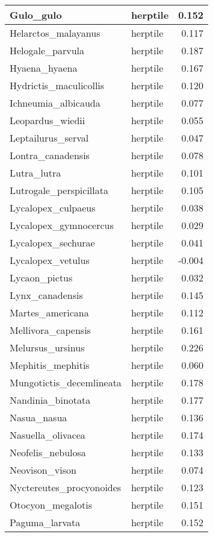 \begin{table}
\begin{tabular}[t]{l|l|r}
\hline
Gulo\_gulo & herptile & 0.152\\
\hline
Helarctos\_malayanus & herptile & 0.117\\
\hline
Helogale\_parvula & herptile & 0.187\\
\hline
Hyaena\_hyaena & herptile & 0.167\\
\hline
Hydrictis\_maculicollis & herptile & 0.120\\
\hline
Ichneumia\_albicauda & herptile & 0.077\\
\hline
Leopardus\_wiedii & herptile & 0.055\\
\hline
Leptailurus\_serval & herptile & 0.047\\
\hline
Lontra\_canadensis & herptile & 0.078\\
\hline
Lutra\_lutra & herptile & 0.101\\
\hline
Lutrogale\_perspicillata & herptile & 0.105\\
\hline
Lycalopex\_culpaeus & herptile & 0.038\\
\hline
Lycalopex\_gymnocercus & herptile & 0.029\\
\hline
Lycalopex\_sechurae & herptile & 0.041\\
\hline
Lycalopex\_vetulus & herptile & -0.004\\
\hline
Lycaon\_pictus & herptile & 0.032\\
\hline
Lynx\_canadensis & herptile & 0.145\\
\hline
Martes\_americana & herptile & 0.112\\
\hline
Mellivora\_capensis & herptile & 0.161\\
\hline
Melursus\_ursinus & herptile & 0.226\\
\hline
Mephitis\_mephitis & herptile & 0.060\\
\hline
Mungotictis\_decemlineata & herptile & 0.178\\
\hline
Nandinia\_binotata & herptile & 0.177\\
\hline
Nasua\_nasua & herptile & 0.136\\
\hline
Nasuella\_olivacea & herptile & 0.174\\
\hline
Neofelis\_nebulosa & herptile & 0.133\\
\hline
Neovison\_vison & herptile & 0.074\\
\hline
Nyctereutes\_procyonoides & herptile & 0.123\\
\hline
Otocyon\_megalotis & herptile & 0.151\\
\hline
Paguma\_larvata & herptile & 0.152\\

\end{tabular}
\end{table}
